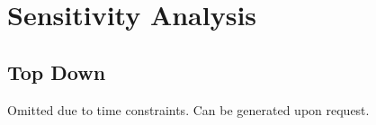 \section{Sensitivity Analysis}\label{sec:sensitivity_analysis}
\subsection{Top Down}\label{subsec:sensitivity_analysis_top_down}
Omitted due to time constraints. Can be generated upon request.
